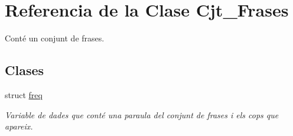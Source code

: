 \hypertarget{class_cjt___frases}{}\section{Referencia de la Clase Cjt\+\_\+\+Frases}
\label{class_cjt___frases}


Conté un conjunt de frases.  


\subsection*{Clases}
\begin{DoxyCompactItemize}
\item 
struct \hyperlink{struct_cjt___frases_1_1freq}{freq}
\begin{DoxyCompactList}\small\item\em Variable de dades que conté una paraula del conjunt de frases i els cops que apareix. \end{DoxyCompactList}\end{DoxyCompactItemize}
